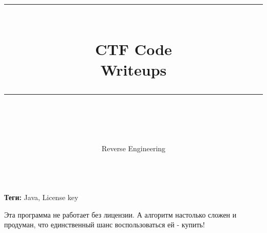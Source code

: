 \documentclass[idxtotoc,hyperref,openany,oneside]{files/reverse} %
\newcommand{\HRule}{\rule{\linewidth}{0.5mm}} %
\begin{document}

\frontmatter %
\title{
\begin{center}
\HRule \\[0.4cm]
{\Huge \bfseries CTF Code \\[0.5cm] \Large Writeups}\\[0.4cm] %
\HRule \\[1.5cm]
\end{center}
}
\author{\Huge Reverse Engineering \\ \\[2cm]} %
\maketitle

\tableofcontents

\mainmatter %












\textbf{Теги:} Java, License key\vspace{\baselineskip}

\begin{tcolorbox}
Эта программа не работает без лицензии. А алгоритм настолько сложен и продуман, что единственный шанс воспользоваться ей - купить!
\end{tcolorbox}
\end{document}
